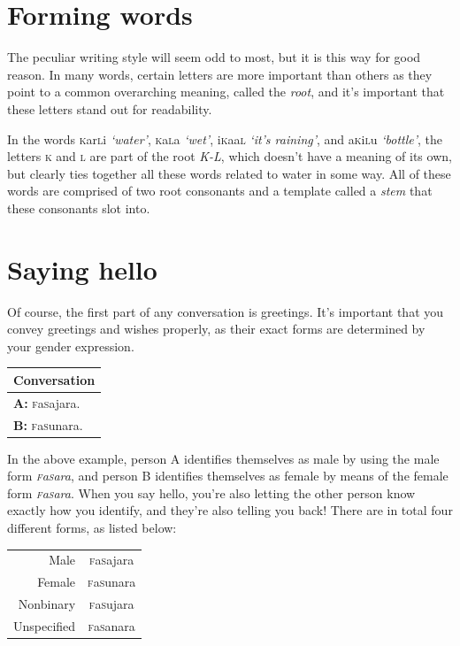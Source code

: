 \documentclass[a5paper,10pt,twoside,openright]{memoir}
\newcommand{\famword}[5]{#1\textsc{#2}#3\textsc{#4}#5}
\newcommand{\glem}[1]{\underline{\smash{#1}}}
\newenvironment{conversation}
    {\begin{table}[ht]
        \begin{tabular}{p{0.962\textwidth}}
        \toprule
        \textbf{Conversation} \\
        \midrule
    }
    { 
        \bottomrule
        \end{tabular}
    \end{table}
    }
\newcommand{\diagline}[2]{\hspace{2em} \textbf{\uppercase{#1:}} {#2} \\}
\begin{document}
\chapter{Forming words}

The peculiar writing style will seem odd to most, but it is this way for good reason. In many words, certain letters are more important than others as they point to a common overarching meaning, called the \emph{root}, and it's important that these letters stand out for readability.

In the words \famword{}{k}{ar}{l}{i} \textit{`water'}, \famword{}{k}{a}{l}{a} \textit{`wet'}, \famword{i}{k}{aa}{l}{} \textit{`it's raining'}, and \famword{a}{k}{i}{l}{u} \textit{`bottle'}, the letters \textsc{k} and \textsc{l} are part of the root \emph{K-L}, which doesn't have a meaning of its own, but clearly ties together all these words related to water in some way. All of these words are comprised of two root consonants and a template called a \emph{stem} that these consonants slot into. 

\chapter{Saying hello}

Of course, the first part of any conversation is greetings. It's important that you convey greetings and wishes properly, as their exact forms are determined by your gender expression.

\begin{conversation}
    \diagline{A}{\famword{}{f}{a}{s}{}ajara.}
    \diagline{B}{\famword{}{f}{a}{s}{}unara.}
\end{conversation}

In the above example, person A identifies themselves as male by using the male form \emph{\famword{}{f}{a}{s}{}\glem{aj}ara}, and person B identifies themselves as female by means of the female form \emph{\famword{}{f}{a}{s}{}\glem{un}ara}. When you say hello, you're also letting the other person know exactly how you identify, and they're also telling you back! There are in total four different forms, as listed below:

\begin{table}[ht]
    \centering
    \begin{tabular}{rc}
        \toprule
        Male & \famword{}{f}{a}{s}{}ajara \\
        Female & \famword{}{f}{a}{s}{}unara \\
        Nonbinary & \famword{}{f}{a}{s}{}ujara \\
        Unspecified & \famword{}{f}{a}{s}{}anara \\
        \bottomrule
    \end{tabular}
\end{table}
\end{document}
